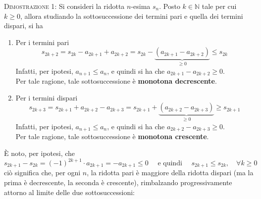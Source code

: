 \documentclass[a4paper]{extarticle}
\begin{document}
\vspace{2em}
\noindent
\normalfont \normalsize
\textsc{Dimostrazione 1}: Si consideri la ridotta $n$-esima $s_n$. Posto $k \in \mathbb{N}$ tale per cui $k \geq 0$, allora studiando la sottosuccessione dei termini pari e quella dei termini dispari, si ha
\begin{enumerate}
    \item Per i termini pari
    \[s_{2k+2} = s_{2k} - a_{2k+1} + a_{2k+2} = s_{2k} - \underbrace{(a_{2k+1}-a_{2k+2})}_{\geq 0} \leq s_{2k}\]
    Infatti, per ipotesi, $a_{n+1} \leq a_n$, e quindi si ha che $a_{2k+1}-a_{2k+2} \geq 0$.\\
    Per tale ragione, tale sottosuccessione è \textbf{monotona decrescente}.

    \item Per i termini dispari
    \[s_{2k+3} = s_{2k+1} + a_{2k+2} - a_{2k+3} = s_{2k+1} + \underbrace{(a_{2k+2}-a_{2k+3})}_{\geq 0} \geq s_{2k+1}\]
    Infatti, per ipotesi, $a_{n+1} \leq a_n$, e quindi si ha che $a_{2k+2}-a_{2k+3} \geq 0$.\\
    Per tale ragione, tale sottosuccessione è \textbf{monotona crescente}.
\end{enumerate}
È noto, per ipotesi, che
\[s_{2k+1} - s_{2k} = (-1)^{2k+1} \cdot a_{2k+1} = -a_{2k+1} \leq 0 \hspace{1em} \text{ e quindi } \hspace{1em} s_{2k+1} \leq s_{2k}, \hspace{1em} \forall k \geq 0\]
ciò significa che, per ogni $n$, la ridotta pari è maggiore della ridotta dispari (ma la prima è decrescente, la seconda è crescente), rimbalzando progressivamente attorno al limite delle due sottosuccessioni:
\end{document}
